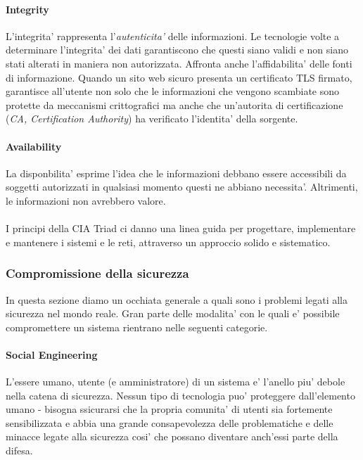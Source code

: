 \paragraph{Integrity}
L'integrita' rappresenta l'\emph{autenticita'} delle informazioni. Le tecnologie volte a determinare l'integrita' dei dati garantiscono che questi siano validi e non siano stati alterati in maniera non autorizzata. Affronta anche l'affidabilita' delle fonti di informazione. Quando un sito web sicuro presenta un certificato TLS firmato, garantisce all'utente non solo che le informazioni che vengono scambiate sono protette da meccanismi crittografici ma anche che un'autorita di certificazione (\emph{CA, Certification Authority}) ha verificato l'identita' della sorgente.

\paragraph{Availability}
La disponbilita' esprime l'idea che le informazioni debbano essere accessibili da soggetti autorizzati in qualsiasi momento questi ne abbiano necessita'. Altrimenti, le informazioni non avrebbero valore.
\\\\
I principi della CIA Triad ci danno una linea guida per progettare, implementare e mantenere i sistemi e le reti,
attraverso un approccio solido e sistematico.
\subsubsection{Compromissione della sicurezza}
In questa sezione diamo un occhiata generale a quali sono i problemi legati alla sicurezza nel mondo reale. Gran parte delle modalita' con le quali e' possibile compromettere un sistema rientrano nelle seguenti categorie.

\paragraph{Social Engineering}
L'essere umano, utente (e amministratore) di un sistema e' l'anello piu' debole nella catena di sicurezza. Nessun tipo di tecnologia puo' proteggere dall'elemento umano - bisogna ssicurarsi che la propria comunita' di utenti sia fortemente sensibilizzata e abbia una grande consapevolezza delle problematiche e delle minacce legate alla sicurezza cosi' che possano diventare anch'essi parte della difesa.

